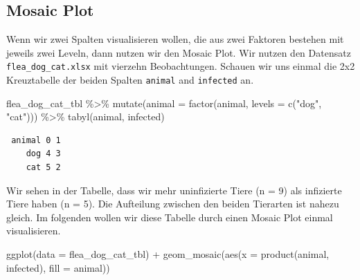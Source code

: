 \documentclass[
  letterpaper,
]{scrbook}
\newenvironment{Shaded}{\begin{snugshade}}{\end{snugshade}}
\newcommand{\AttributeTok}[1]{\textcolor[rgb]{0.40,0.45,0.13}{#1}}
\newcommand{\FunctionTok}[1]{\textcolor[rgb]{0.28,0.35,0.67}{#1}}
\newcommand{\NormalTok}[1]{\textcolor[rgb]{0.00,0.23,0.31}{#1}}
\newcommand{\SpecialCharTok}[1]{\textcolor[rgb]{0.37,0.37,0.37}{#1}}
\newcommand{\StringTok}[1]{\textcolor[rgb]{0.13,0.47,0.30}{#1}}
\begin{document}
\hypertarget{sec-eda-mosaic}{%
\subsection{Mosaic Plot}\label{sec-eda-mosaic}}

Wenn wir zwei Spalten visualisieren wollen, die aus zwei Faktoren
bestehen mit jeweils zwei Leveln, dann nutzen wir den Mosaic Plot. Wir
nutzen den Datensatz \texttt{flea\_dog\_cat.xlsx} mit vierzehn
Beobachtungen. Schauen wir uns einmal die 2x2 Kreuztabelle der beiden
Spalten \texttt{animal} and \texttt{infected} an.

\begin{Shaded}
\begin{Highlighting}[]
\NormalTok{flea\_dog\_cat\_tbl }\SpecialCharTok{\%\textgreater{}\%}
  \FunctionTok{mutate}\NormalTok{(}\AttributeTok{animal =} \FunctionTok{factor}\NormalTok{(animal, }\AttributeTok{levels =} \FunctionTok{c}\NormalTok{(}\StringTok{"dog"}\NormalTok{, }\StringTok{"cat"}\NormalTok{))) }\SpecialCharTok{\%\textgreater{}\%} 
  \FunctionTok{tabyl}\NormalTok{(animal, infected) }
\end{Highlighting}
\end{Shaded}

\begin{verbatim}
 animal 0 1
    dog 4 3
    cat 5 2
\end{verbatim}

Wir sehen in der Tabelle, dass wir mehr uninfizierte Tiere (n = 9) als
infizierte Tiere haben (n = 5). Die Aufteilung zwischen den beiden
Tierarten ist nahezu gleich. Im folgenden wollen wir diese Tabelle durch
einen Mosaic Plot einmal visualisieren.

\begin{Shaded}
\begin{Highlighting}[]
\FunctionTok{ggplot}\NormalTok{(}\AttributeTok{data =}\NormalTok{ flea\_dog\_cat\_tbl) }\SpecialCharTok{+}
  \FunctionTok{geom\_mosaic}\NormalTok{(}\FunctionTok{aes}\NormalTok{(}\AttributeTok{x =} \FunctionTok{product}\NormalTok{(animal, infected), }\AttributeTok{fill =}\NormalTok{ animal)) }
\end{Highlighting}
\end{Shaded}
\end{document}
